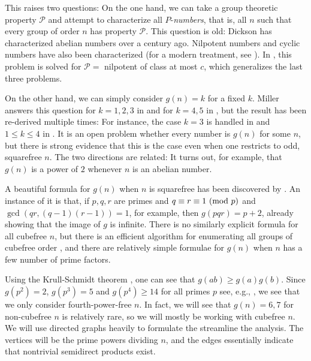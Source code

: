 This raises two questions: On the one hand, we can take a group theoretic property $\mathcal{P}$ and attempt to characterize all $P$-\emph{numbers}, that is, all $n$ such that every group of order $n$ has property $\mathcal{P}$. This question is old: Dickson {\cite{dickson}} has characterized abelian numbers over a century ago. Nilpotent numbers {\cite{pazderski}} and cyclic numbers {\cite{szele}} have also been characterized (for a modern treatment, see {\cite{nilnumb}}). In {\cite{mueller}}, this problem is solved for $\mathcal{P} = $ nilpotent of class at most $c$, which generalizes the last three problems.

On the other hand, we can simply consider $g(n) = k$ for a fixed $k$. Miller answers this question for $k = 1, 2, 3$ in {\cite{miller1}} and for $k = 4, 5$ in {\cite{miller2}}, but the result has been re-derived multiple times: For instance, the case $k = 3$ is handled in {\cite{olsson}} and $1 \le k \le 4$ in {\cite{gnumoas}}. It is an open problem whether every number is $g(n)$ for some $n$, but there is strong evidence that this is the case even when one restricts to odd, squarefree $n$. The two directions are related: It turns out, for example, that $g(n)$ is a power of $2$ whenever $n$ is an abelian number.

A beautiful formula for $g(n)$ when $n$ is squarefree has been discovered by  {\cite[Theorem~5.1]{gnumoas}}. An instance of it is that, if $p, q, r$ are primes and $q \equiv r \equiv 1 \ (\mathrm{mod} \ p)$ and $\gcd(qr, (q-1)(r-1)) = 1$, for example, then $g(pqr) = p + 2$, already showing that the image of $g$ is infinite. There is no similarly explicit formula for all cubefree $n$, but there is an efficient algorithm for enumerating all groups of cubefree order {\cite{cubefree}}, and there are relatively simple formulae for $g(n)$ when $n$ has a few number of prime factors.

Using the Krull-Schmidt theorem {\cite{hungerford}}, one can see that $g(ab) \ge g(a)g(b)$. Since \mbox{$g(p^2) = 2$,} $g(p^3) = 5$ and $g(p^4) \ge 14$ for all primes $p$ {see, e.g., \cite[Theorem~3.1]{gnumoas}}, we see that we only consider fourth-power-free $n$. In fact, we will see that $g(n) = 6, 7$ for non-cubefree $n$ is relatively rare, so we will mostly be working with cubefree $n$. We will use directed graphs heavily to formulate the streamline the analysis. The vertices will be the prime powers dividing $n$, and the edges essentially indicate that nontrivial semidirect products exist.

\section{}
